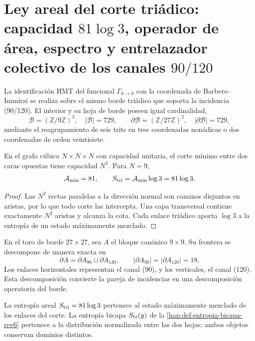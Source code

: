 \section{Ley areal del corte triádico: capacidad \(81\log 3\), operador de área, espectro y entrelazador colectivo de los canales \(90/120\)}
\label{hap:sec:area-entrelazamiento-barbero-rev11}

La identificación HMT del funcional \(\Gamma_{6\to8}\) con la coordenada
de Barbero--Immirzi se realiza sobre el mismo borde triádico que soporta la
incidencia (90/120). El interior y su hoja de borde poseen igual cardinalidad,
\[
 \mathcal B=(\mathbb Z/9\mathbb Z)^3,
 \quad |\mathcal B|=729,
 \qquad
 \partial\mathcal B=(\mathbb Z/27\mathbb Z)^2,
 \quad |\partial\mathcal B|=729,
\]
mediante el reagrupamiento de seis trits en tres coordenadas nonádicas o dos
coordenadas de orden veintisiete.

\begin{theorem}
\label{hap:thm:ley-areal-corte-triadico-rev11}
En el grafo cúbico \(N\times N\times N\) con capacidad unitaria, el corte
mínimo entre dos caras opuestas tiene capacidad \(N^2\). Para \(N=9\),
\[
 \mathcal A_{\min}=81,
 \qquad S_{\rm tri}=\mathcal A_{\min}\log3=81\log3.
\]
\end{theorem}
\begin{proof}
Las \(N^2\) rectas paralelas a la dirección normal son caminos disjuntos en
aristas, por lo que todo corte las intercepta. Una capa transversal contiene
exactamente \(N^2\) aristas y alcanza la cota. Cada enlace triádico aporta
\(\log3\) a la entropía de un estado máximamente mezclado.
\end{proof}

En el toro de borde \(27\times27\), sea \(A\) el bloque canónico
\(9\times9\). Su frontera se descompone de manera exacta en
\begin{equation}
 \partial A=\partial A_{90}\sqcup\partial A_{120},
 \qquad |\partial A_{90}|=|\partial A_{120}|=18.
 \label{hap:eq:corte-90-120-rev11}
\end{equation}
Los enlaces horizontales representan el canal (90), y los verticales, el
canal (120). Esta descomposición convierte la pareja de incidencias en una
descomposición operatoria del borde.

La entropía areal \(S_{\rm tri}=81\log3\) pertenece al estado máximamente
mezclado de los enlaces del corte. La entropía bicapa
\(S_{\rm bi}(y)\) de la \cref{hap:def:entropia-bicapa-rev6} pertenece a la
distribución normalizada entre las dos hojas; ambos objetos conservan
dominios distintos.

